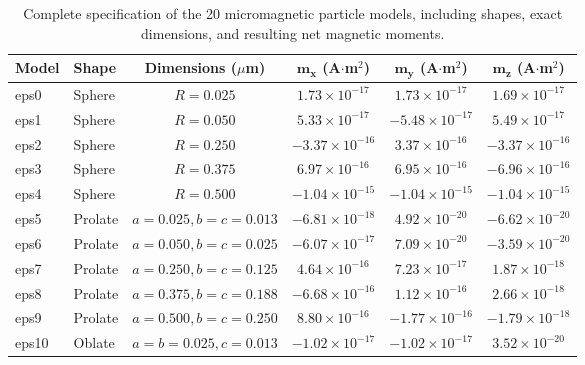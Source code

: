 \documentclass[11pt,a4paper]{article}
\begin{document}
\begin{table}[!htbp]
\centering
\caption{Complete specification of the 20 micromagnetic particle models, including shapes, exact dimensions, and resulting net magnetic moments.}
\label{tab:models_si}
\begin{tabular}{llcccc}
\toprule
\textbf{Model} & \textbf{Shape} & \textbf{Dimensions ($\mu$m)} &
$\mathbf{m_x}$ (A$\cdot$m$^2$) &
$\mathbf{m_y}$ (A$\cdot$m$^2$) &
$\mathbf{m_z}$ (A$\cdot$m$^2$) \\
\midrule
eps0 & Sphere & $R = 0.025$ &
$1.73 \times 10^{-17}$ &
$1.73 \times 10^{-17}$ &
$1.69 \times 10^{-17}$ \\

eps1 & Sphere & $R = 0.050$ &
$5.33 \times 10^{-17}$ &
$-5.48 \times 10^{-17}$ &
$5.49 \times 10^{-17}$ \\

eps2 & Sphere & $R = 0.250$ &
$-3.37 \times 10^{-16}$ &
$3.37 \times 10^{-16}$ &
$-3.37 \times 10^{-16}$ \\

eps3 & Sphere & $R = 0.375$ &
$6.97 \times 10^{-16}$ &
$6.95 \times 10^{-16}$ &
$-6.96 \times 10^{-16}$ \\

eps4 & Sphere & $R = 0.500$ &
$-1.04 \times 10^{-15}$ &
$-1.04 \times 10^{-15}$ &
$-1.04 \times 10^{-15}$ \\

\midrule

eps5 & Prolate & $a = 0.025, b = c = 0.013$ &
$-6.81 \times 10^{-18}$ &
$4.92 \times 10^{-20}$ &
$-6.62 \times 10^{-20}$ \\

eps6 & Prolate & $a = 0.050, b = c = 0.025$ &
$-6.07 \times 10^{-17}$ &
$7.09 \times 10^{-20}$ &
$-3.59 \times 10^{-20}$ \\

eps7 & Prolate & $a = 0.250, b = c = 0.125$ &
$4.64 \times 10^{-16}$ &
$7.23 \times 10^{-17}$ &
$1.87 \times 10^{-18}$ \\

eps8 & Prolate & $a = 0.375, b = c = 0.188$ &
$-6.68 \times 10^{-16}$ &
$1.12 \times 10^{-16}$ &
$2.66 \times 10^{-18}$ \\

eps9 & Prolate & $a = 0.500, b = c = 0.250$ &
$8.80 \times 10^{-16}$ &
$-1.77 \times 10^{-16}$ &
$-1.79 \times 10^{-18}$ \\

\midrule

eps10 & Oblate & $a = b = 0.025, c = 0.013$ &
$-1.02 \times 10^{-17}$ &
$-1.02 \times 10^{-17}$ &
$3.52 \times 10^{-20}$ \\


\end{tabular}
\end{table}
\end{document}
